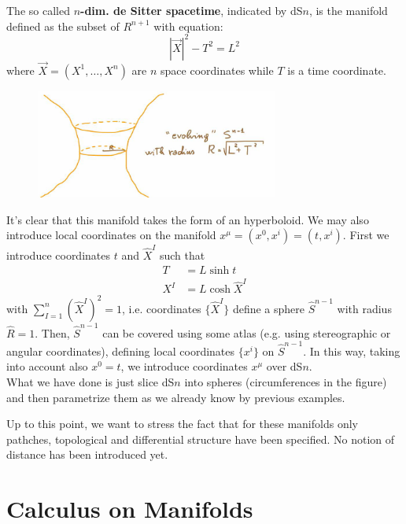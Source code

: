 \documentclass[../main/main.tex]{subfiles}
\begin{document}
\begin{example}
The so called \textbf{$n$-dim. de Sitter spacetime}, indicated by dS$n$, is the manifold defined as the subset of  $R^{n+1}$ with equation:
\[|\vec X|^2-T^2=L^2\]
where $\vec X=(X^1,\dots,X^n)$ are $n$ space coordinates while $T$ is a time coordinate. 
\begin{figure}[H]
\centering
\includegraphics[width=8cm]{../img/de-Sitter-manifold.jpg}
\end{figure}
\noindent It's clear that this manifold takes the form of an hyperboloid. 
We may also introduce local coordinates on the manifold $x^\mu=(x^0,x^i)=(t,x^i)$. First we introduce coordinates $t$ and $\hat X^I$ such that
\begin{align*}
T&=L\sinh t\\
X^I&=L\cosh \hat X^I
\end{align*}
with $\sum_{I=1}^n(\hat X^I)^2=1$, i.e. coordinates $\{\hat X^I\}$ define a sphere $\hat S^{n-1}$ with radius $\hat R=1$. Then, $\hat S^{n-1}$ can be covered using some atlas (e.g. using stereographic or angular coordinates), defining local coordinates $\{x^i\}$ on $\hat S^{n-1}$. In this way, taking into account also $x^0=t$, we introduce coordinates $x^\mu$ over dS$n$. \\
What we have done is just slice dS$n$ into spheres (circumferences in the figure) and then parametrize them as we already know by previous examples. 

\end{example}

Up to this point, we want to stress the fact that for these manifolds only pathches, topological and differential structure have been specified. No notion of distance has been introduced yet. 


\section{Calculus on Manifolds}
\end{document}
